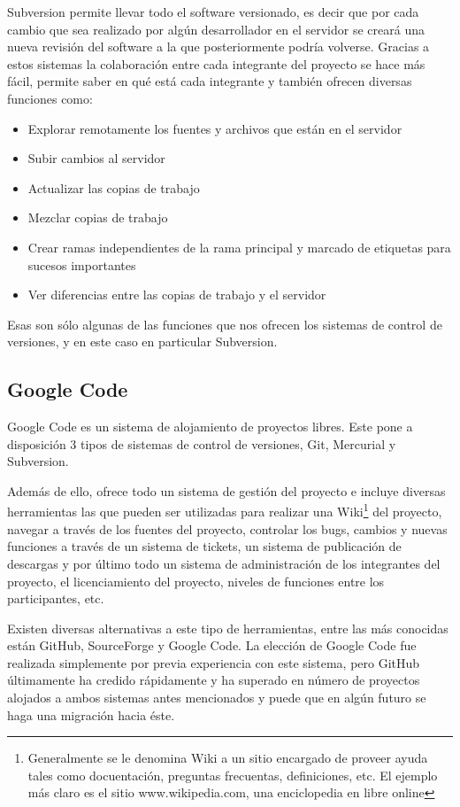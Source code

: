 \documentclass[a4paper,12pt,openany,oneside]{book}
\begin{document}
Subversion permite llevar todo el software versionado, es decir que por cada cambio que sea realizado por algún desarrollador en el servidor se creará una nueva revisión del software a la que posteriormente podría volverse. Gracias a estos sistemas la colaboración entre cada integrante del proyecto se hace más fácil, permite saber en qué está cada integrante y también ofrecen diversas funciones como:
\begin{itemize}
\item Explorar remotamente los fuentes y archivos que están en el servidor
\item Subir cambios al servidor
\item Actualizar las copias de trabajo
\item Mezclar copias de trabajo
\item Crear ramas independientes de la rama principal y marcado de etiquetas para sucesos importantes
\item Ver diferencias entre las copias de trabajo y el servidor
\end{itemize}
Esas son sólo algunas de las funciones que nos ofrecen los sistemas de control de versiones, y en este caso en particular Subversion.
\subsection{Google Code}
Google Code es un sistema de alojamiento de proyectos libres. Este pone a disposición 3 tipos de sistemas de control de versiones, Git, Mercurial y Subversion. 

Además de ello, ofrece todo un sistema de gestión del proyecto e incluye diversas herramientas las que pueden ser utilizadas para realizar una Wiki\footnote{Generalmente se le denomina Wiki a un sitio encargado de proveer ayuda tales como docuentación, preguntas frecuentas, definiciones, etc. El ejemplo más claro es el sitio www.wikipedia.com, una enciclopedia en libre online} del proyecto, navegar a través de los fuentes del proyecto, controlar los bugs, cambios y nuevas funciones a través de un sistema de tickets, un sistema de publicación de descargas y por último todo un sistema de administración de los integrantes del proyecto, el licenciamiento del proyecto, niveles de funciones entre los participantes, etc.

Existen diversas alternativas a este tipo de herramientas, entre las más conocidas están GitHub, SourceForge y Google Code. La elección de Google Code fue realizada simplemente por previa experiencia con este sistema, pero GitHub últimamente ha credido rápidamente y ha superado en número de proyectos alojados a ambos sistemas antes mencionados y puede que en algún futuro se haga una migración hacia éste.
\end{document}
